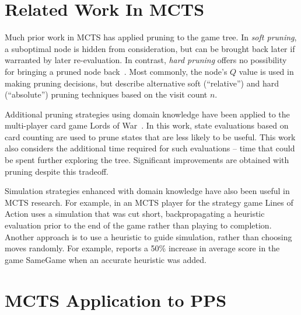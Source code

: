 \documentclass[letterpaper]{article}
\begin{document}
\section{Related Work In MCTS}
\label{relatedWork}


Much prior work in MCTS has applied pruning to the game tree. In {\it soft pruning}, a suboptimal node is hidden from consideration, but can be brought back later if warranted by later re-evaluation. In contrast, {\it hard pruning} offers no possibility for bringing a pruned node back~\cite{browne2012survey}. Most commonly, the node's $Q$ value is used in making pruning decisions, but \cite{huang2010pruning} describe alternative soft (``relative'') and hard (``absolute'') pruning techniques based on the visit count $n$.

Additional pruning strategies using domain knowledge have been applied to the multi-player card game Lords of War~\cite{sephton2014ieee}. In this work, state evaluations based on card counting are used to prune states that are less likely to be useful. This work also considers the additional time required for such evaluations -- time that could be spent further exploring the tree. Significant improvements are obtained with pruning despite this tradeoff.

Simulation strategies enhanced with domain knowledge have also been useful in MCTS research. For example, in \cite{winands2010monte} an MCTS player for the strategy game Lines of Action uses a simulation that was cut short, backpropagating a heuristic evaluation prior to the end of the game rather than playing to completion. Another approach is to use a heuristic to guide simulation, rather than choosing moves randomly. For example, \cite{schadd2012single} reports a 50\% increase in average score in the game SameGame when an accurate heuristic was added.

\section{MCTS Application to PPS}
\end{document}
